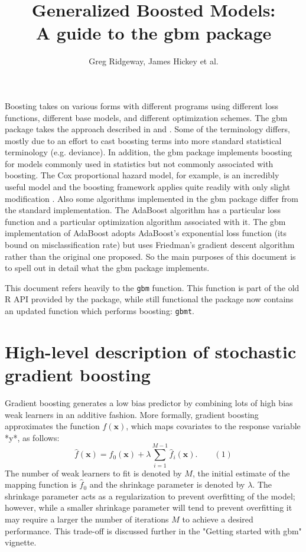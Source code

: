 \documentclass{article}
\title{Generalized Boosted Models:\\A guide to the gbm package} \author{Greg Ridgeway, James Hickey et al.}
\begin{document}


\maketitle


Boosting takes on various forms with different programs using
different loss functions, different base models, and different
optimization schemes. The gbm package takes the approach described in
\cite{Friedman:2001} and \cite{Friedman:2002}. Some of the terminology
differs, mostly due to an effort to cast boosting terms into more
standard statistical terminology (e.g. deviance). In addition, the gbm
package implements boosting for models commonly used in statistics but
not commonly associated with boosting. The Cox proportional hazard
model, for example, is an incredibly useful model and the boosting
framework applies quite readily with only slight modification
\cite{Ridgeway:1999}. Also some algorithms implemented in the gbm
package differ from the standard implementation. The AdaBoost
algorithm \cite{FreundSchapire:1997} has a particular loss function
and a particular optimization algorithm associated with it. The gbm
implementation of AdaBoost adopts AdaBoost's exponential loss function
(its bound on misclassification rate) but uses Friedman's gradient
descent algorithm rather than the original one proposed. So the main
purposes of this document is to spell out in detail what the gbm
package implements.

This document refers heavily to the \texttt{gbm} function.  This 
function is part of the old R API provided by the package, while
still functional the package now contains an updated function which
performs boosting: \texttt{gbmt}.

\section{High-level description of stochastic gradient boosting}
Gradient boosting generates a low bias predictor by combining lots of high bias weak learners in an additive fashion. More formally, gradient boosting approximates the function $f(\textbf{x})$, which maps covariates to the response variable *y*, as follows:
$$\hat{f}(\textbf{x}) = \hat{f}_{0}(\textbf{x}) + \lambda \sum_{i=1}^{M-1} \hat{f}_{i}(\textbf{x}). \qquad (1)$$
The number of weak learners to fit is denoted by $M$, the initial estimate of the mapping function is $\hat{f}_0$ and the shrinkage parameter is denoted by $\lambda$.  The shrinkage parameter acts as a regularization to prevent overfitting of the model; however, while a smaller shrinkage parameter will tend to prevent overfitting it may require a larger the number of iterations $M$ to achieve a desired performance.  This trade-off is discussed further in the "Getting started with gbm" vignette.
\end{document}
